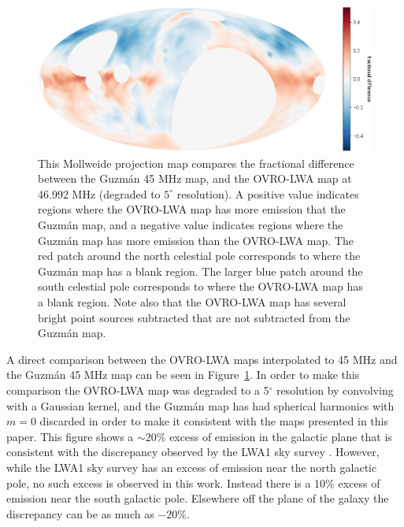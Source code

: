 \documentclass[twocolumn]{aastex61}
\begin{document}
\begin{figure}[t]
    \centering
    \includegraphics[height=0.32\textheight]{figures/guzman/guzman}
    \caption{
        This Mollweide projection map compares the fractional difference between the Guzm\'{a}n 45
        MHz map, and the OVRO-LWA map at 46.992 MHz (degraded to $5^\circ$ resolution). A positive
        value indicates regions where the OVRO-LWA map has more emission that the Guzm\'{a}n map,
        and a negative value indicates regions where the Guzm\'{a}n map has more emission than the
        OVRO-LWA map. The red patch around the north celestial pole corresponds to where the
        Guzm\'{a}n map has a blank region.  The larger blue patch around the south celestial pole
        corresponds to where the OVRO-LWA map has a blank region. Note also that the OVRO-LWA map
        has several bright point sources subtracted that are not subtracted from the Guzm\'{a}n map.
    }
    \label{fig:guzman-comparison}
\end{figure}

A direct comparison between the OVRO-LWA maps interpolated to 45 MHz and the Guzm\'{a}n 45 MHz map
\citep{2011A&A...525A.138G} can be seen in Figure~\ref{fig:guzman-comparison}. In order to make this
comparison the OVRO-LWA map was degraded to a 5$^\circ$ resolution by convolving with a Gaussian
kernel, and the Guzm\'{a}n map has had spherical harmonics with $m=0$ discarded in order to make it
consistent with the maps presented in this paper. This figure shows a $\sim20\%$ excess of emission
in the galactic plane that is consistent with the discrepancy observed by the LWA1 sky survey
\citep{2017MNRAS.469.4537D}. However, while the LWA1 sky survey has an excess of emission near the
north galactic pole, no such excess is observed in this work. Instead there is a 10\% excess of
emission near the south galactic pole. Elsewhere off the plane of the galaxy the discrepancy can be
as much as $-20\%$.
\end{document}
